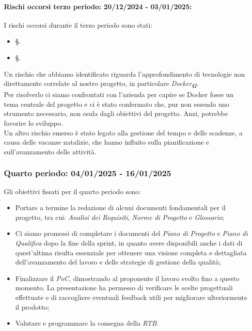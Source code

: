 \paragraph{Rischi occorsi terzo periodo: 20/12/2024 - 03/01/2025: }
I rischi occorsi durante il terzo periodo sono stati:
\begin{itemize}
    \item \S{}.
    \item \S{}.
\end{itemize}
Un rischio che abbiamo identificato riguarda l'approfondimento di tecnologie non direttamente correlate al nostro progetto, in particolare {\emph{Docker}}\textsubscript{\textit{\textbf{G}}}.\\
Per risolverlo ci siamo confrontati con l'azienda per capire se Docker fosse un tema centrale del progetto e ci è stato confermato che, pur non essendo uno strumento necessario, non esula dagli obiettivi del progetto. Anzi, potrebbe favorire lo sviluppo.\\
Un altro rischio emerso è stato legato alla gestione del tempo e delle scadenze, a causa delle vacanze natalizie, che hanno influito sulla pianificazione e sull’avanzamento delle attività.

\newpage
\subsubsection{Quarto periodo: 04/01/2025 - 16/01/2025}  
\label{sec:prev_cons_quarto_periodo}  

Gli obiettivi fissati per il quarto periodo sono:  
\begin{itemize} 
    \item Portare a termine la redazione di alcuni documenti fondamentali per il progetto, tra cui: \emph{Analisi dei Requisiti}, \emph{Norme di Progetto} e \emph{Glossario};
    \item Ci siamo promessi di completare i documenti del \emph{Piano di Progetto} e \emph{Piano di Qualifica} dopo la fine della sprint, in quanto avere disponibili anche i dati di quest'ultima risulta essenziale per ottenere una visione completa e dettagliata dell'avanzamento del lavoro e delle strategie di gestione della qualità;  
    \item Finalizzare il \emph{PoC}, dimostrando al proponente il lavoro svolto fino a questo momento. La presentazione ha permesso di verificare le scelte progettuali effettuate e di raccogliere eventuali feedback utili per migliorare ulteriormente il prodotto;
    \item Valutare e programmare la consegna della \emph{RTB}.
\end{itemize} 

